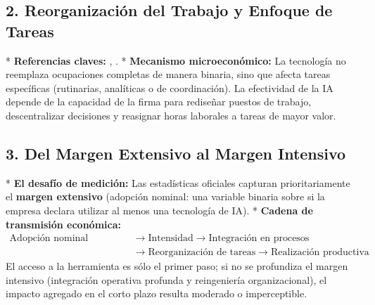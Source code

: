 \documentclass[12pt,a4paper]{article}
\begin{document}
\subsection{2. Reorganización del Trabajo y Enfoque de Tareas}
* \textbf{Referencias claves:} \citet{bresnahan2002information}, \citet{acemoglu2018race}.
* \textbf{Mecanismo microeconómico:} La tecnología no reemplaza ocupaciones completas de manera binaria, sino que afecta tareas específicas (rutinarias, analíticas o de coordinación). La efectividad de la IA depende de la capacidad de la firma para rediseñar puestos de trabajo, descentralizar decisiones y reasignar horas laborales a tareas de mayor valor.

\subsection{3. Del Margen Extensivo al Margen Intensivo}
* \textbf{El desafío de medición:} Las estadísticas oficiales capturan prioritariamente el \textbf{margen extensivo} (adopción nominal: una variable binaria sobre si la empresa declara utilizar al menos una tecnología de IA).
* \textbf{Cadena de transmisión económica:}
\begin{equation*}
\begin{aligned}
\text{Adopción nominal (Eurostat)} &\longrightarrow \text{Intensidad} \longrightarrow \text{Integración en procesos} \\
&\longrightarrow \text{Reorganización de tareas} \longrightarrow \text{Realización productiva}
\end{aligned}
\end{equation*}
El acceso a la herramienta es sólo el primer paso; si no se profundiza el margen intensivo (integración operativa profunda y reingeniería organizacional), el impacto agregado en el corto plazo resulta moderado o imperceptible.
\end{document}
